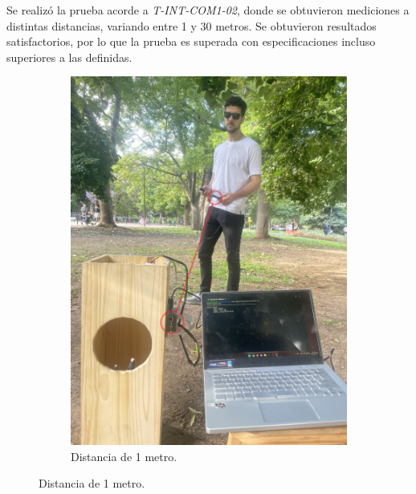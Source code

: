 Se realizó la prueba acorde a \textit{T-INT-COM1-02}, donde se obtuvieron mediciones a distintas distancias, variando entre 1 y 30 metros. Se obtuvieron resultados satisfactorios, por lo que la prueba es superada con especificaciones incluso superiores a las definidas.
\begin{figure}[H]
	\centering
	\begin{subfigure}{0.3\textwidth}
		\centering
		\includegraphics[width=\linewidth]{ImagenesValidacion del prototipo/TINTCOM12a}
		\caption{Distancia de 1 metro.}
	\end{subfigure}	
\end{figure}
